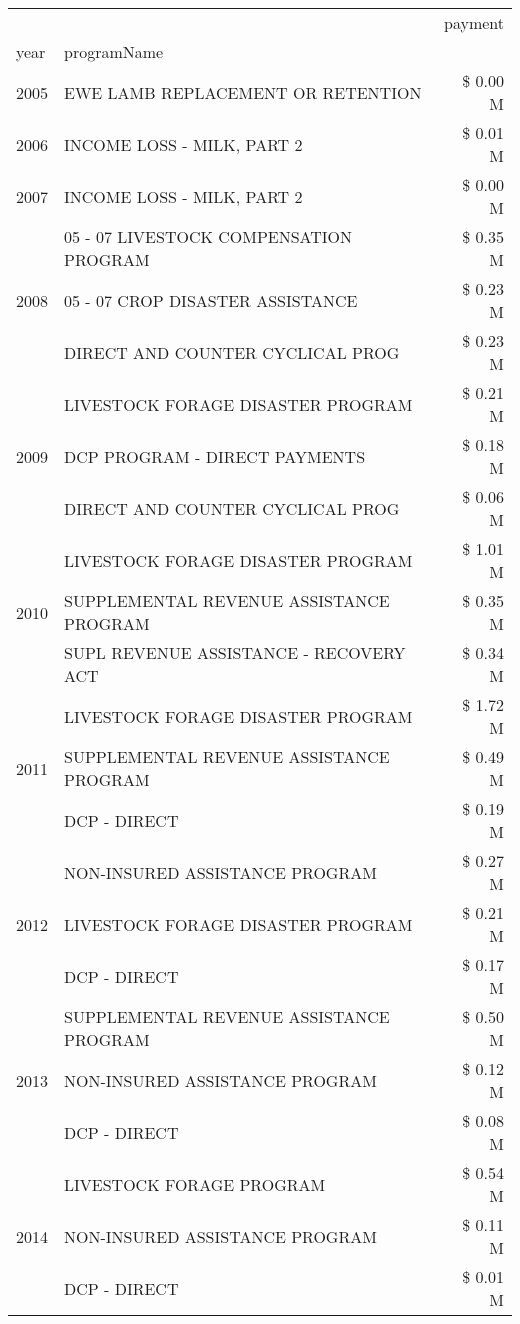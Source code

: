 \begin{tabular}{llr}
\toprule
 &  & payment \\
year & programName &  \\
\midrule
2005 & EWE LAMB REPLACEMENT OR RETENTION & \$ 0.00 M \\
\cline{1-3}
2006 & INCOME LOSS - MILK, PART 2 & \$ 0.01 M \\
\cline{1-3}
2007 & INCOME LOSS - MILK, PART 2 & \$ 0.00 M \\
\cline{1-3}
\multirow[t]{3}{*}{2008} & 05 - 07 LIVESTOCK COMPENSATION PROGRAM & \$ 0.35 M \\
 & 05 - 07 CROP DISASTER ASSISTANCE & \$ 0.23 M \\
 & DIRECT AND COUNTER CYCLICAL PROG & \$ 0.23 M \\
\cline{1-3}
\multirow[t]{3}{*}{2009} & LIVESTOCK FORAGE DISASTER  PROGRAM & \$ 0.21 M \\
 & DCP PROGRAM - DIRECT PAYMENTS & \$ 0.18 M \\
 & DIRECT AND COUNTER CYCLICAL PROG & \$ 0.06 M \\
\cline{1-3}
\multirow[t]{3}{*}{2010} & LIVESTOCK FORAGE DISASTER PROGRAM & \$ 1.01 M \\
 & SUPPLEMENTAL REVENUE ASSISTANCE PROGRAM & \$ 0.35 M \\
 & SUPL REVENUE ASSISTANCE - RECOVERY ACT & \$ 0.34 M \\
\cline{1-3}
\multirow[t]{3}{*}{2011} & LIVESTOCK FORAGE DISASTER PROGRAM & \$ 1.72 M \\
 & SUPPLEMENTAL REVENUE ASSISTANCE PROGRAM & \$ 0.49 M \\
 & DCP - DIRECT & \$ 0.19 M \\
\cline{1-3}
\multirow[t]{3}{*}{2012} & NON-INSURED ASSISTANCE PROGRAM & \$ 0.27 M \\
 & LIVESTOCK FORAGE DISASTER PROGRAM & \$ 0.21 M \\
 & DCP - DIRECT & \$ 0.17 M \\
\cline{1-3}
\multirow[t]{3}{*}{2013} & SUPPLEMENTAL REVENUE ASSISTANCE PROGRAM & \$ 0.50 M \\
 & NON-INSURED ASSISTANCE PROGRAM & \$ 0.12 M \\
 & DCP - DIRECT & \$ 0.08 M \\
\cline{1-3}
\multirow[t]{3}{*}{2014} & LIVESTOCK FORAGE PROGRAM & \$ 0.54 M \\
 & NON-INSURED ASSISTANCE PROGRAM & \$ 0.11 M \\
 & DCP - DIRECT & \$ 0.01 M \\

\end{tabular}
